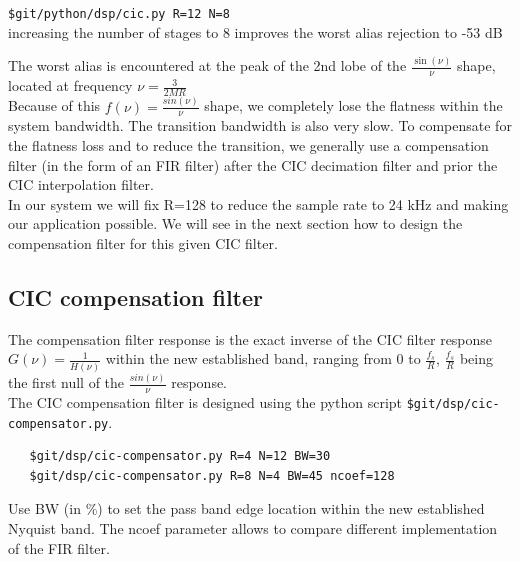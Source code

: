 \documentclass{article}
\begin{document}
\begin{center}
\begin{minipage}{0.40\linewidth}
		{\tt \$git/python/dsp/cic.py R=12 N=8} \\
		increasing the number of stages to 8
		improves the worst alias rejection to -53 dB
	\end{minipage}
\end{center}

The worst alias is encountered at the peak
of the 2nd lobe of the $\frac{\sin(\nu)}{\nu}$ shape, 
located at frequency $\nu = \frac{3}{2MR}$ \\

Because of this $f(\nu) = \frac{sin(\nu)}{\nu}$ shape,
we completely lose the flatness within the system
bandwidth. The transition bandwidth is also very slow.
To compensate for the flatness loss and to reduce
the transition, 
we generally use a compensation filter (in the form of an FIR
filter) after the CIC decimation filter
and prior the CIC interpolation filter. \\

In our system we will fix R=128 to reduce
the sample rate to 24 kHz and making our application
possible. We will see in the next section
how to design the compensation filter for this given
CIC filter.

\subsection{CIC compensation filter}

The compensation filter response is the exact inverse
of the CIC filter response $G(\nu) = \frac{1}{H(\nu)}$ 
within the new established band, ranging
from 0 to $\frac{f_s}{R}$,
$\frac{f_s}{R}$ being the first null of the $\frac{sin(\nu)}{\nu}$ response. \\

The CIC compensation filter is designed
using the python script {\tt \$git/dsp/cic-compensator.py}. 

\begin{verbatim}
   $git/dsp/cic-compensator.py R=4 N=12 BW=30
   $git/dsp/cic-compensator.py R=8 N=4 BW=45 ncoef=128
\end{verbatim}

Use BW (in \%) to set the pass band edge
location within the new established Nyquist band.
The ncoef parameter allows to compare different
implementation of the FIR filter.
\end{document}
